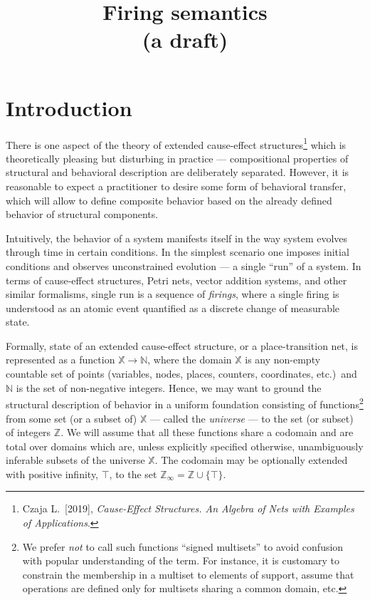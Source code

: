 \documentclass [a4paper,12pt] {article}
\theoremstyle{definition}
\begin{document}
\title {Firing semantics\\(a draft)}
\author {}
\date {}
\maketitle

\section {Introduction}

There is one aspect of the theory of extended cause-effect
structures\footnote{Czaja L.\ [2019], {\em Cause-Effect Structures.
    An Algebra of Nets with Examples of Applications}\/.} which is
theoretically pleasing but disturbing in practice --- compositional
properties of structural and behavioral description are deliberately
separated.  However, it is reasonable to expect a practitioner to
desire some form of behavioral transfer, which will allow to define
composite behavior based on the already defined behavior of structural
components.

Intuitively, the behavior of a system manifests itself in the way
system evolves through time in certain conditions.  In the simplest
scenario one imposes initial conditions and observes unconstrained
evolution --- a single ``run'' of a system.  In terms of cause-effect
structures, Petri nets, vector addition systems, and other similar
formalisms, single run is a sequence of {\em firings}\/, where a
single firing is understood as an atomic event quantified as a
discrete change of measurable state.

Formally, state of an extended cause-effect structure, or a
place-transition net, is represented as a function ${\mathbb
  X}\rightarrow{\mathbb N}$, where the domain ${\mathbb X}$ is any
non-empty countable set of points (variables, nodes, places, counters,
coordinates, etc.)\ and ${\mathbb N}$ is the set of non-negative
integers.  Hence, we may want to ground the structural description of
behavior in a uniform foundation consisting of functions\footnote {We
  prefer {\em not}\/ to call such functions ``signed multisets'' to
  avoid confusion with popular understanding of the term.  For
  instance, it is customary to constrain the membership in a multiset
  to elements of support, assume that operations are defined only for
  multisets sharing a common domain, etc.} from some set (or a subset
of) ${\mathbb X}$ --- called the {\em universe}\/ --- to the set (or
subset) of integers ${\mathbb Z}$.  We will assume that all these
functions share a codomain and are total over domains which are,
unless explicitly specified otherwise, unambiguously inferable subsets
of the universe ${\mathbb X}$.  The codomain may be optionally
extended with positive infinity, $\top$, to the set ${\mathbb
  Z}_\infty = {\mathbb Z}\cup\{\top\}$.
\end{document}
